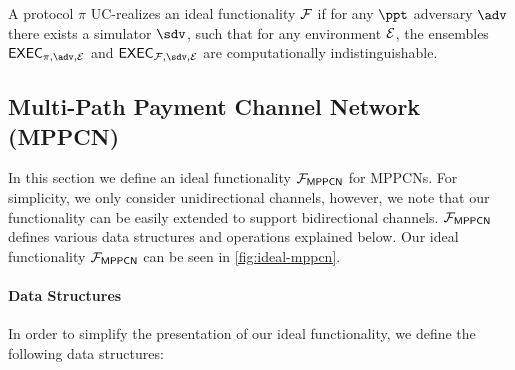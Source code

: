 \begin{definition}
A protocol $\pi$ UC-realizes an ideal functionality $\mathcal{F}$ if for any $\ppt$ adversary 
$\adv$ there exists a simulator $\sdv$, such that for any environment $\mathcal{E}$, the 
ensembles $\exec_{\pi, \adv, \dist}$ and $\exec_{\FF, \sdv, \dist}$ are computationally 
indistinguishable.
\end{definition}

\subsection{Multi-Path Payment Channel Network (MPPCN)}
\label{sec:mppcn}

In this section we define an ideal functionality $\mathcal{F}_{\mathsf{MPPCN}}$ for MPPCNs. 
For simplicity, we only consider unidirectional channels, however, we note 
that our functionality can be easily extended to support bidirectional channels. 
$\mathcal{F}_{\mathsf{MPPCN}}$ defines various data structures and operations explained below. 
Our ideal functionality $\mathcal{F}_{\mathsf{MPPCN}}$ can be seen in \cref{fig:ideal-mppcn}.

\paragraph{Data Structures} 
In order to simplify the presentation of our ideal functionality, we define the following data 
structures:

